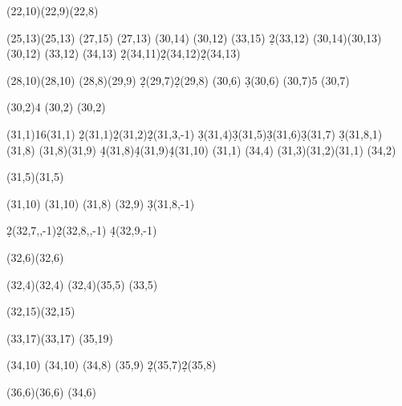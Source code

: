 \documentclass{article}
\begin{document}
\begin{sseqdata}
\nustruct(22,10)\nustruct(22,9)\nustruct(22,8)


\class["P^3h_1"](25,13)\etasqclass(25,13)
\divfourclass["P^3h_2" {below=0em}](27,15)
\nuclass(27,13)
\divfourclass["P^2d_0" {left=0.2em}](30,14)
\etacubclass(30,12)
\diveightclass["P^2e_0" {below=0em}](33,15)
\d2(33,12) %
\nustruct(30,14)\nustruct(30,13)\nustruct(30,12)
\etaclass(33,12)
\divfourclass["Pj" {right}](34,13)
\d2(34,11)\d2(34,12)\d2(34,13) %



\class(28,10)\divfourclass["{Pg=d_0^2}" {below left=-0.5em}](28,10)
\etaclass(28,8)\divfourclass["k" below](29,9)
\d2(29,7)\d2(29,8) %
\class["r" below](30,6) \d3(30,6) %
\tower(30,7){5}
\classoptions["s" below](30,7)

\tower(30,2){4}
\classoptions["h_4^2" below](30,2)
\etaclass(30,2)

\tower(31,1){16}\classoptions["h_5" below](31,1)
\d2(31,1)\d2(31,2)\d2(31,3,-1) %
\d3(31,4)\d3(31,5)\d3(31,6)\d3(31,7) \d3(31,8,1) %
\replaceclass[offset={(0,0)}](31,8) %
\structline(31,8)(31,9)
\d4(31,8)\d4(31,9)\d4(31,10) %
\etacubclass(31,1)
\divfourclass[](34,4)
\nustruct(31,3)\nustruct(31,2)\nustruct(31,1)
\nuclass(34,2)

\class["n" above](31,5)\nuclass(31,5)

\class(31,10)
\divfourclass["d_0e_0" {below right=0em,xshift=-5pt}](31,10)
\etaclass(31,8)
\divfourclass["l" {right=0em}](32,9)
\d3(31,8,-1)     %

\d2(32,7,,-1)\d2(32,8,,-1) %
\d4(32,9,-1) %

\class["q"](32,6)\etaclass(32,6)

\class["d_1"](32,4)\etaclass(32,4)
\nuclass(32,4)\nuclass(35,5)
(33,5)

\class["P^3c_0"{xshift=4pt,yshift=2pt}](32,15)\etaclass(32,15)

\class["P^4h_1"](33,17)\etasqclass(33,17)
\divfourclass["P^4h_2" right](35,19)

\class(34,10)
\divfourclass["d_0g" left](34,10)
\etaclass(34,8)
\divfourclass["m" right](35,9)
\d2(35,7)\d2(35,8) %


\class["t"](36,6)\etaclass(36,6)
\nustruct(34,6)


\end{sseqdata}
\end{document}
